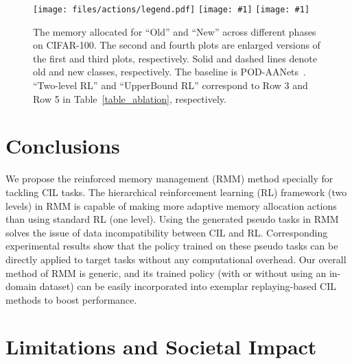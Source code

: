 \documentclass{article}
\newcommand{\cotronlvsapcetop}{\vspace{0.0cm}}
\newcommand{\cotronlvsapcebottom}{\vspace{0.0cm}}
\begin{document}
\begin{figure}
\newcommand{\newincludegraphics}[1]{\texttt{[image: \#1]}}
\centering
\cotronlvsapcetop
\texttt{[image: files/actions/legend.pdf]}
\newincludegraphics{files/actions/cifar100_5phase_final_v2.pdf}
\hspace{1mm}
\newincludegraphics{files/actions/cifar100_25phase_final_v2.pdf}
\vspace{0.3cm}
\caption{
The memory allocated for ``Old'' and ``New'' across different phases on CIFAR-100. 
The second and fourth plots are enlarged versions of the first and third plots, respectively.
Solid and dashed lines denote old and new classes, respectively. 
The baseline is POD-AANets~\cite{Liu2020AANets}. ``Two-level RL'' and ``UpperBound RL'' correspond to Row 3 and Row 5 in Table~\ref{table_ablation}, respectively. 
}
\cotronlvsapcebottom
\label{figure_action_plots}
\end{figure}  \section{Conclusions}
\label{sec_conclusion}

We propose the reinforced memory management (RMM) method specially for tackling CIL tasks. 
The hierarchical reinforcement learning (RL) framework (two levels) in RMM is capable of making more adaptive memory allocation actions than using standard RL (one level).
Using the generated pseudo tasks in RMM solves the issue of data incompatibility between CIL and RL. Corresponding experimental results show that the policy trained on these pseudo tasks can be directly applied to target tasks without any computational overhead.
Our overall method of RMM is generic, and its trained policy (with or without using an in-domain dataset) can be easily incorporated into exemplar replaying-based CIL methods to boost  performance. \section*{Limitations and Societal Impact}
\end{document}
